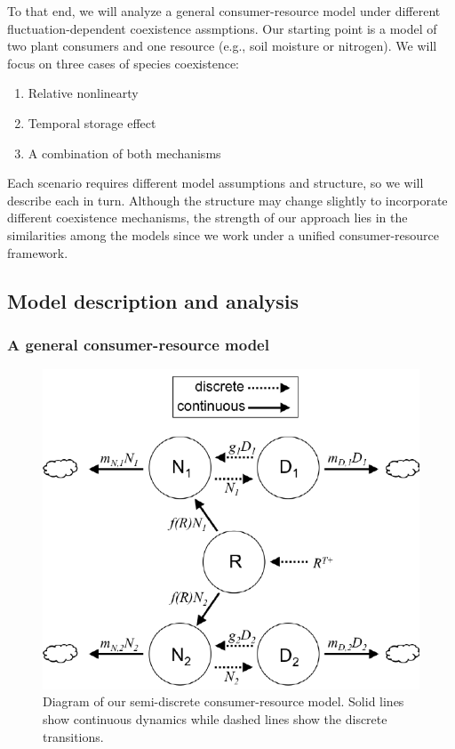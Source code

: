 \documentclass[12pt,]{article}
\begin{document}
To that end, we will analyze a general consumer-resource model under
different fluctuation-dependent coexistence assmptions. Our starting
point is a model of two plant consumers and one resource (e.g., soil
moisture or nitrogen). We will focus on three cases of species
coexistence:

\begin{enumerate}
  \item Relative nonlinearty
  \item Temporal storage effect
  \item A combination of both mechanisms
\end{enumerate}

Each scenario requires different model assumptions and structure, so we
will describe each in turn. Although the structure may change slightly
to incorporate different coexistence mechanisms, the strength of our
approach lies in the similarities among the models since we work under a
unified consumer-resource framework.

\subsection{Model description and
analysis}\label{model-description-and-analysis}

\subsubsection{A general consumer-resource
model}\label{a-general-consumer-resource-model}

\begin{figure}[htbp]
\centering
\includegraphics{components/figure/manuscript-figure_1.pdf}
\caption{Diagram of our semi-discrete consumer-resource model. Solid
lines show continuous dynamics while dashed lines show the discrete
transitions.}
\end{figure}
\end{document}
